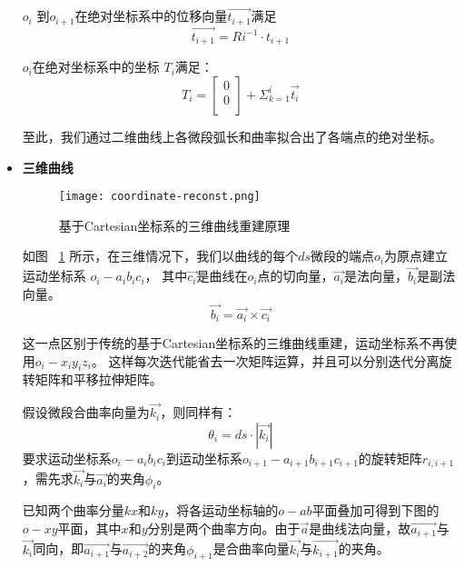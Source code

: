 \begin{itemize}
$o_i$ 到$o_{i+1}$在绝对坐标系中的位移向量$\vec{t_{i+1}}$满足
    \begin{equation}
    \vec{t_{i+1}} = Ri^{-1}\cdot t_{i+1}
    \end{equation}
    
$o_i$在绝对坐标系中的坐标 $T_i$满足：
    \begin{equation}
    T_i = \left[
    		\begin{matrix}
        0\\
        0\\
      	\end{matrix}
      \right]
      + \Sigma_{k=1} ^ {i} \vec{t_i}
    \end{equation}
    
至此，我们通过二维曲线上各微段弧长和曲率拟合出了各端点的绝对坐标。

\item \textbf{三维曲线} \\

\FloatBarrier
\begin{figure}
\centering
\texttt{[image: coordinate-reconst.png]}
\caption{基于Cartesian坐标系的三维曲线重建原理}
\label{fig:coordinate-reconst} 
\end{figure}
\FloatBarrier

如图 ~\ref{fig:coordinate-reconst} 所示，在三维情况下，我们以曲线的每个$ds$微段的端点$o_i$为原点建立运动坐标系\cite{three-dimensional-curve} $o_i-a_ib_ic_i$，
其中$\vec{c_i}$是曲线在$o_i$点的切向量，$\vec{a_i}$是法向量，$\vec{b_i}$是副法向量。
\begin{equation}
\vec{b_i} = \vec{a_i} \times \vec{c_i}
\end{equation}

这一点区别于传统的基于Cartesian坐标系的三维曲线重建，运动坐标系不再使用$o_i-x_iy_iz_i$。
这样每次迭代能省去一次矩阵运算，并且可以分别迭代分离旋转矩阵和平移拉伸矩阵。

假设微段合曲率向量为$\vec{k_i}$，则同样有：
\begin{equation}
\theta_i = ds\cdot |\vec{k_i}|
\end{equation}
要求运动坐标系$o_i-a_ib_ic_i$到运动坐标系$o_{i+1}-a_{i+1}b_{i+1}c_{i+1}$的旋转矩阵$r_{i, i+1}$，需先求$\vec{k_i}$与$\vec{a_i}$的夹角$\phi_i$。

已知两个曲率分量$kx$和$ky$，将各运动坐标轴的$o-ab$平面叠加可得到下图的$o-xy$平面，其中$x$和$y$分别是两个曲率方向。由于$\vec{a}$是曲线法向量，故$\vec{a_{i+1}}$与$\vec{k_i}$同向，即$\vec{a_{i+1}}$与$\vec{a_{i+2}}$的夹角$\phi_{i+1}$是合曲率向量$\vec{k_i}$与$\vec{k_{i+1}}$的夹角。


\end{itemize}
